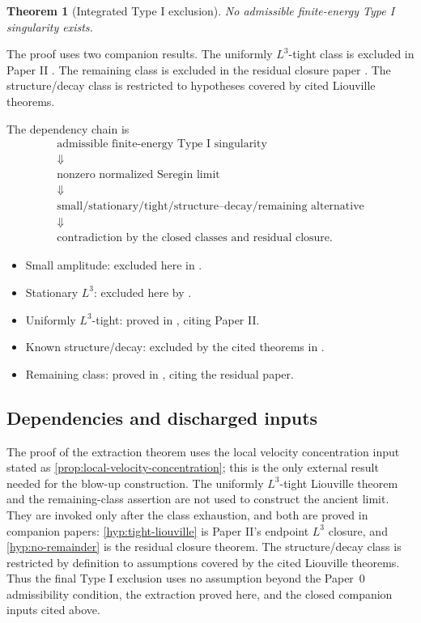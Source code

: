 \documentclass[11pt]{amsart}
\theoremstyle{plain}
\newtheorem{theorem}{Theorem}[section]
\theoremstyle{definition}
\theoremstyle{remark}
\numberwithin{equation}{section}
\begin{document}
\begin{theorem}[Integrated Type I exclusion]
\label{thm:remaining-criterion}
No admissible finite-energy Type I singularity exists.
\end{theorem}

The proof uses two companion results.  The uniformly \(L^3\)-tight class is
excluded in Paper II \cite{DuranPaperII}.  The remaining class is excluded in
the residual closure paper \cite{DuranResidual2026}.  The structure/decay
class is restricted to hypotheses covered by cited Liouville theorems.

The dependency chain is
\[
\begin{array}{c}
\text{admissible finite-energy Type I singularity}
\\
\Downarrow
\\
\text{nonzero normalized Seregin limit}
\\
\Downarrow
\\
\text{small/stationary/tight/structure--decay/remaining alternative}
\\
\Downarrow
\\
\text{contradiction by the closed classes and residual closure.}
\end{array}
\]

\begin{itemize}[leftmargin=*,itemsep=2pt]
\item Small amplitude: excluded here in .
\item Stationary \(L^3\): excluded here by \cite{NRS1996}.
\item Uniformly \(L^3\)-tight: proved in , citing
Paper II.
\item Known structure/decay: excluded by the cited theorems in
.
\item Remaining class: proved in , citing the residual
paper.
\end{itemize}

\subsection{Dependencies and discharged inputs}

The proof of the extraction theorem uses the local velocity concentration
input stated as \cref{prop:local-velocity-concentration}; this is the only
external result needed for the blow-up construction.  The uniformly
\(L^3\)-tight Liouville theorem and the remaining-class assertion are not used
to construct the ancient limit.  They are invoked only after the class
exhaustion, and both are proved in companion papers:
\cref{hyp:tight-liouville} is Paper II's endpoint \(L^3\) closure, and
\cref{hyp:no-remainder} is the residual closure theorem.  The structure/decay
class is restricted by definition to assumptions covered by the cited
Liouville theorems.  Thus the final Type I exclusion uses no assumption beyond
the Paper~0 admissibility condition, the extraction proved here, and the
closed companion inputs cited above.
\end{document}

